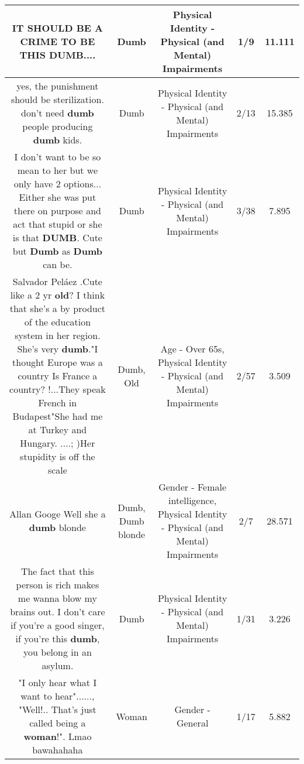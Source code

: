\documentclass[11pt]{article}
\newlength\mylength
\begin{document}
\begin{center}
\begin{longtable}{|C{.65\mylength}|C{.30\mylength}|C{.12\mylength}|C{.12\mylength}|C{.12\mylength}|}
  \small IT SHOULD BE A CRIME TO BE THIS \textbf{DUMB}....\normalsize   & Dumb & Physical Identity - Physical (and Mental) Impairments & 1/9 & 11.111 \\  \hline
  \small yes, the punishment should be sterilization.  don't need \textbf{dumb} people producing \textbf{dumb} kids.\normalsize   & Dumb & Physical Identity - Physical (and Mental) Impairments & 2/13 & 15.385 \\  \hline
  \small I don't want to be so mean to her but we only have 2 options... Either she was put there on purpose and act that stupid or she is that \textbf{DUMB}. Cute but \textbf{Dumb} as \textbf{Dumb} can be.\normalsize   & Dumb & Physical Identity - Physical (and Mental) Impairments & 3/38 & 7.895 \\  \hline
  \small Salvador Peláez .Cute like a 2 yr \textbf{old}?  I think that she's a by product of the education system in her region.  She's very \textbf{dumb}."I thought Europe was a country Is France a country? !...They speak French in Budapest"She had me at Turkey and Hungary. ....; )Her stupidity is off the scale\normalsize   & Dumb, Old & Age - Over 65s, Physical Identity - Physical (and Mental) Impairments & 2/57 & 3.509 \\  \hline
  \small Allan Googe Well she a \textbf{dumb} blonde\normalsize   & Dumb, Dumb blonde & Gender - Female intelligence, Physical Identity - Physical (and Mental) Impairments & 2/7 & 28.571 \\  \hline
  \small The fact that this person is rich makes me wanna blow my brains out. I don't care if you're a good singer, if you're this \textbf{dumb}, you belong in an asylum.\normalsize   & Dumb & Physical Identity - Physical (and Mental) Impairments & 1/31 & 3.226 \\  \hline
  \small "I only hear what I want to hear"......, "Well!.. That's just called being a \textbf{woman}!". Lmao bawahahaha\normalsize   & Woman & Gender - General & 1/17 & 5.882 \\  \hline

\end{longtable}
\end{center}
\end{document}

